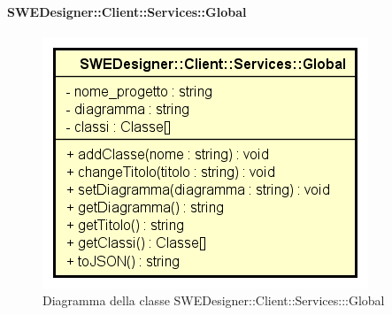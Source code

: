           	\paragraph{SWEDesigner::Client::Services::Global}
          	\begin{figure}[h!]
			\centering
			\includegraphics[scale=0.8]{Classi/SWEDesigner__Client__Services__Global.png}
			\caption{Diagramma della classe SWEDesigner::Client::Services:::Global}
 			\end{figure}
